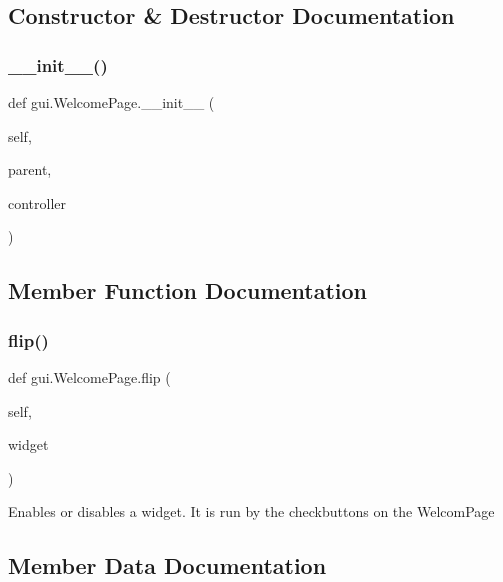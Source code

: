 \subsection{Constructor \& Destructor Documentation}
\mbox{\label{classgui_1_1_welcome_page_ad76f3aa5300f247046acdc4a54caf51b}} 
\subsubsection{\texorpdfstring{\_\_init\_\_()}{\_\_init\_\_()}}
{\footnotesize\ttfamily def gui.\+Welcome\+Page.\+\_\+\+\_\+init\+\_\+\+\_\+ (\begin{DoxyParamCaption}\item[{}]{self,  }\item[{}]{parent,  }\item[{}]{controller }\end{DoxyParamCaption})}



\subsection{Member Function Documentation}
\mbox{\label{classgui_1_1_welcome_page_a3544802d544b577d46a633649ba3212b}} 
\subsubsection{\texorpdfstring{flip()}{flip()}}
{\footnotesize\ttfamily def gui.\+Welcome\+Page.\+flip (\begin{DoxyParamCaption}\item[{}]{self,  }\item[{}]{widget }\end{DoxyParamCaption})}

\begin{DoxyVerb}Enables or disables a widget. It is run by the checkbuttons on the WelcomPage
\end{DoxyVerb}
 

\subsection{Member Data Documentation}
\mbox{\label{classgui_1_1_welcome_page_a8a8f59dabb5188fbe1a0f6ea21933725}} 
